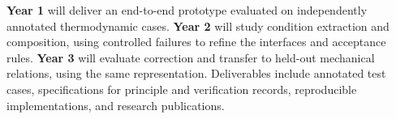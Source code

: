 \documentclass[12pt]{article}
\begin{document}
\textbf{Year 1} will deliver an end-to-end prototype evaluated on independently annotated thermodynamic cases. \textbf{Year 2} will study condition extraction and composition, using controlled failures to refine the interfaces and acceptance rules. \textbf{Year 3} will evaluate correction and transfer to held-out mechanical relations, using the same representation. Deliverables include annotated test cases, specifications for principle and verification records, reproducible implementations, and research publications.

\clearpage
\singlespacing
\setlength{\bibsep}{3pt}

  {}
  {}
\end{document}
